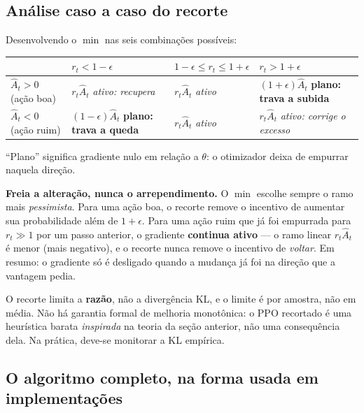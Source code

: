 \documentclass[11pt, a4paper]{article}
\newcommand{\Ahat}{\hat{A}}
\begin{document}
\subsection{Análise caso a caso do recorte}

Desenvolvendo o $\min$ nas seis combinações possíveis:

\medskip
\begin{center}\small
\begin{tabular}{@{}p{}p{}p{}p{}@{}}
\toprule
 & $r_t < 1-\epsilon$ & $1-\epsilon \le r_t \le 1+\epsilon$ & $r_t > 1+\epsilon$ \\
\midrule
$\Ahat_t > 0$ (ação boa)  & $r_t\Ahat_t$ \; \emph{ativo: recupera} & $r_t\Ahat_t$ \; \emph{ativo}
  & $(1+\epsilon)\Ahat_t$ \; \textbf{plano: trava a subida} \\
$\Ahat_t < 0$ (ação ruim) & $(1-\epsilon)\Ahat_t$ \; \textbf{plano: trava a queda} & $r_t\Ahat_t$ \; \emph{ativo}
  & $r_t\Ahat_t$ \; \emph{ativo: corrige o excesso} \\
\bottomrule
\end{tabular}
\end{center}
\vspace{-0.3em}
``Plano'' significa gradiente nulo em relação a $\theta$: o otimizador deixa de
empurrar naquela direção.

\begin{ideiabox}
\textbf{Freia a alteração, nunca o arrependimento.} O $\min$ escolhe sempre o
ramo mais \emph{pessimista}. Para uma ação boa, o recorte remove o incentivo de aumentar
sua probabilidade além de $1+\epsilon$. Para uma ação ruim que já foi empurrada
para $r_t \gg 1$ por um passo anterior, o gradiente \textbf{continua ativo} ---
o ramo linear $r_t\Ahat_t$ é menor (mais negativo), e o recorte nunca remove o
incentivo de \emph{voltar}. Em resumo: o gradiente só é desligado quando a
mudança já foi na direção que a vantagem pedia.
\end{ideiabox}

\begin{alertabox}
O recorte limita a \textbf{razão}, não a divergência KL, e o limite é por
amostra, não em média. Não há garantia formal de melhoria monotônica: o PPO
recortado é uma heurística barata \emph{inspirada} na teoria da seção anterior,
não uma consequência dela. Na prática, deve-se monitorar a KL empírica.
\end{alertabox}

\subsection{O algoritmo completo, na forma usada em implementações}
\end{document}
